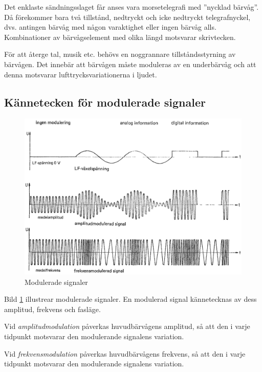 Det enklaste sändningsslaget får anses vara morsetelegrafi med
''nycklad bärvåg''.
Då förekommer bara två tillstånd, nedtryckt och icke nedtryckt telegrafnyckel,
dvs. antingen bärvåg med någon varaktighet eller ingen bärvåg alls.
Kombinationer av bärvågselement med olika längd motsvarar skrivtecken.

För att återge tal, musik etc. behövs en noggrannare tillståndsstyrning av
bärvågen.
Det innebär att bärvågen måste moduleras av en underbärvåg och att denna
motsvarar lufttrycksvariationerna i ljudet.

\subsection{Kännetecken för modulerade signaler}

\begin{figure}
\includegraphics[width=\textwidth]{images/cropped_pdfs/bild_2_1-22.pdf}
\caption{Modulerade signaler}
\label{fig:BildII1-22}
\end{figure}

Bild \ref{fig:BildII1-22} illustrear modulerade signaler.
En modulerad signal kännetecknas av dess amplitud, frekvens och fasläge.

Vid \emph{amplitudmodulation} påverkas huvudbärvågens amplitud, så att den i
varje tidpunkt motsvarar den modulerande signalens variation.

Vid \emph{frekvensmodulation} påverkas huvudbärvågens frekvens, så att den i
varje tidpunkt motsvarar den modulerande signalens variation.

